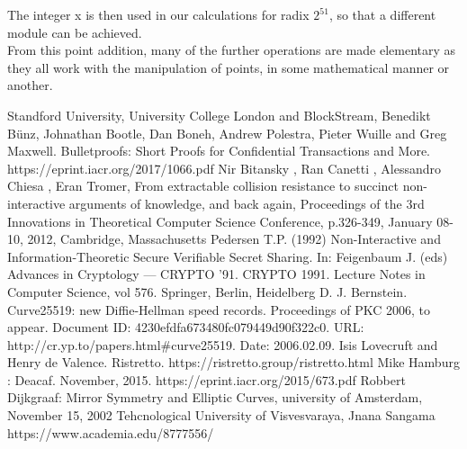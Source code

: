 \documentclass[letterpaper, 10 pt, conference]{ieeeconf}  %
\begin{document}
The integer x is then used in our calculations for radix $ 2^{51} $, so that a different module can be achieved. \\ 
From this point addition, many of the further operations are made elementary as they all work with the manipulation of points, in some mathematical manner or another.  


\newpage



\addtolength{\textheight}{-12cm}   %



\begin{thebibliography}{99}

 Standford University, University College London and BlockStream, Benedikt Bünz, Johnathan Bootle, Dan Boneh, Andrew Polestra, Pieter Wuille and Greg Maxwell. Bulletproofs: Short Proofs for Confidential Transactions and More.\\ https://eprint.iacr.org/2017/1066.pdf
 Nir Bitansky , Ran Canetti , Alessandro Chiesa , Eran Tromer, From extractable collision resistance to succinct non-interactive arguments of knowledge, and back again, Proceedings of the 3rd Innovations in Theoretical Computer Science Conference, p.326-349, January 08-10, 2012, Cambridge, Massachusetts
 Pedersen T.P. (1992) Non-Interactive and Information-Theoretic Secure Verifiable Secret Sharing. In: Feigenbaum J. (eds) Advances in Cryptology — CRYPTO ’91. CRYPTO 1991. Lecture Notes in Computer Science, vol 576. Springer, Berlin, Heidelberg
 D. J. Bernstein. Curve25519: new Diffie-Hellman speed records. Proceedings of PKC 2006, to appear. Document ID: 4230efdfa673480fc079449d90f322c0. URL: http://cr.yp.to/papers.html\#curve25519. Date: 2006.02.09.
 Isis Lovecruft and Henry de Valence. Ristretto. https://ristretto.group/ristretto.html
 Mike Hamburg : Deacaf. November, 2015. https://eprint.iacr.org/2015/673.pdf
Robbert Dijkgraaf: Mirror Symmetry and Elliptic Curves, university of Amsterdam, November 15, 2002
 Tehcnological University of Visvesvaraya, Jnana Sangama https://www.academia.edu/8777556/

\end{thebibliography}
\end{document}
